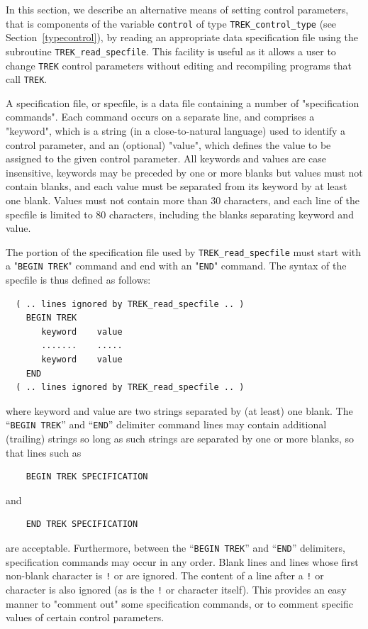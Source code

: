 \documentclass{galahad}
\newcommand{\packagename}{TREK}
\begin{document}

\galfeatures
\noindent In this section, we describe an alternative means of setting
control parameters, that is components of the variable {\tt control} of type
{\tt \packagename\_control\_type}
(see Section~\ref{typecontrol}),
by reading an appropriate data specification file using the
subroutine {\tt \packagename\_read\_specfile}. This facility
is useful as it allows a user to change  {\tt \packagename} control parameters
without editing and recompiling programs that call {\tt \packagename}.

A specification file, or specfile, is a data file containing a number of
"specification commands". Each command occurs on a separate line,
and comprises a "keyword",
which is a string (in a close-to-natural language) used to identify a
control parameter, and
an (optional) "value", which defines the value to be assigned to the given
control parameter. All keywords and values are case insensitive,
keywords may be preceded by one or more blanks but
values must not contain blanks, and
each value must be separated from its keyword by at least one blank.
Values must not contain more than 30 characters, and
each line of the specfile is limited to 80 characters,
including the blanks separating keyword and value.

The portion of the specification file used by
{\tt \packagename\_read\_specfile}
must start
with a "{\tt BEGIN \packagename}" command and end with an
"{\tt END}" command.  The syntax of the specfile is thus defined as follows:
\begin{verbatim}
  ( .. lines ignored by TREK_read_specfile .. )
    BEGIN TREK
       keyword    value
       .......    .....
       keyword    value
    END
  ( .. lines ignored by TREK_read_specfile .. )
\end{verbatim}
where keyword and value are two strings separated by (at least) one blank.
The ``{\tt BEGIN \packagename}'' and ``{\tt END}'' delimiter command lines
may contain additional (trailing) strings so long as such strings are
separated by one or more blanks, so that lines such as
\begin{verbatim}
    BEGIN TREK SPECIFICATION
\end{verbatim}
and
\begin{verbatim}
    END TREK SPECIFICATION
\end{verbatim}
are acceptable. Furthermore,
between the
``{\tt BEGIN \packagename}'' and ``{\tt END}'' delimiters,
specification commands may occur in any order.  Blank lines and
lines whose first non-blank character is {\tt !} or {\tt *} are ignored.
The content
of a line after a {\tt !} or {\tt *} character is also
ignored (as is the {\tt !} or {\tt *}
character itself). This provides an easy manner to "comment out" some
specification commands, or to comment specific values
of certain control parameters.
\end{document}
